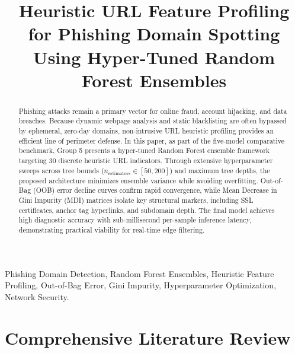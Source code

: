 \documentclass[conference]{IEEEtran}
\begin{document}
\title{Heuristic URL Feature Profiling for Phishing Domain Spotting Using Hyper-Tuned Random Forest Ensembles}

\author{
}

\maketitle

\begin{abstract}
Phishing attacks remain a primary vector for online fraud, account hijacking, and data breaches. Because dynamic webpage analysis and static blacklisting are often bypassed by ephemeral, zero-day domains, non-intrusive URL heuristic profiling provides an efficient line of perimeter defense. In this paper, as part of the five-model comparative benchmark, Group 5 presents a hyper-tuned Random Forest ensemble framework targeting 30 discrete heuristic URL indicators. Through extensive hyperparameter sweeps across tree bounds ($n_{\text{estimators}} \in [50, 200]$) and maximum tree depths, the proposed architecture minimizes ensemble variance while avoiding overfitting. Out-of-Bag (OOB) error decline curves confirm rapid convergence, while Mean Decrease in Gini Impurity (MDI) matrices isolate key structural markers, including SSL certificates, anchor tag hyperlinks, and subdomain depth. The final model achieves high diagnostic accuracy with sub-millisecond per-sample inference latency, demonstrating practical viability for real-time edge filtering.
\end{abstract}

\begin{IEEEkeywords}
Phishing Domain Detection, Random Forest Ensembles, Heuristic Feature Profiling, Out-of-Bag Error, Gini Impurity, Hyperparameter Optimization, Network Security.
\end{IEEEkeywords}



\section{Comprehensive Literature Review}
\label{sec:literature_review}

\end{document}
